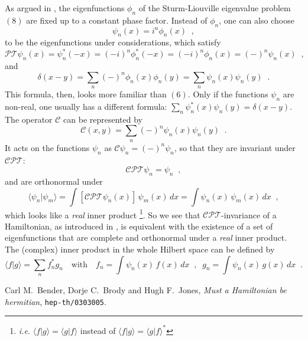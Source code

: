 \documentclass[a4paper,12pt]{article}
\newcommand{\PP}{\mathcal{P}}
\newcommand{\TT}{\mathcal{T}}
\newcommand{\CC}{\mathcal{C}}
\begin{document}
As argued in \cite{paper}, the eigenfunctions $\phi_n$ of the Sturm-Liouville
eigenvalue problem $(8)$ are fixed up to a constant phase factor.  
Instead of $\phi_n$, one can also choose
\begin{displaymath}
   \psi_n(x) = i^n\phi_n(x)
\;\;,
\end{displaymath}
to be the eigenfunctions under considerations, which satisfy 
\begin{displaymath}
   \PP\TT\psi_n(x) = \psi_n^*(-x) = (-i)^n\phi_n^*(-x) 
                   = (-i)^n\phi_n(x) = (-)^n\psi_n(x)
\;\;,
\end{displaymath}
and 
\begin{displaymath}
   \delta(x-y) = \sum_n(-)^n\phi_n(x)\phi_n(y) = \sum_n\psi_n(x)\psi_n(y)
\;\;.
\end{displaymath}
This formula, then, looks more familiar than $(6)$. Only if the functions
$\psi_n$ are non-real, one usually has a different formula:
$\sum_n\psi_n^*(x)\psi_n(y) = \delta(x-y)$.
The operator $\CC$ can be represented by
\begin{displaymath}
   \CC(x,y) = \sum_n(-)^n\psi_n(x)\psi_n(y)
\;\;.
\end{displaymath}
It acts on the functions $\psi_n$ as $\CC\psi_n=(-)^n\psi_n$, so that they
are invariant under $\CC\PP\TT$:
\begin{displaymath}
   \CC\PP\TT\psi_n = \psi_n
\;\;,
\end{displaymath}
and are orthonormal under
\begin{displaymath}
   \langle \psi_n|\psi_m \rangle
   = \int[\CC\PP\TT\psi_n(x)]\,\psi_m(x)\,dx
   = \int\psi_n(x)\,\psi_m(x)\,dx
\;\;,
\end{displaymath}
which looks like a {\em real\/} inner product%
\footnote{{\it i.e.\/} $\langle f|g\rangle=\langle g|f\rangle$ instead of 
$\langle f|g\rangle=\langle g|f\rangle^*$}. 
So we see that $\CC\PP\TT$-invariance of a Hamiltonian, as introduced in \cite{paper},
is equivalent with the
existence of a set of eigenfunctions that are complete and orthonormal under a
{\em real\/} inner product.  The (complex) inner product in the whole Hilbert
space can be defined by
\begin{displaymath}
   \langle f|g\rangle = \sum_nf_n^*g_n
   \quad\textrm{with}\quad
   f_n = \int\psi_n(x)\,f(x)\,dx
   \;\;,\;\;
   g_n = \int\psi_n(x)\,g(x)\,dx
\;\;.
\end{displaymath}

\begin{thebibliography}{}
 Carl M.\ Bender, Dorje C.\ Brody and Hugh F.\ Jones,
          {\it Must a Hamiltonian be hermitian\/},
          {\tt hep-th/0303005}.
\end{thebibliography} 
%

%
\end{document}
